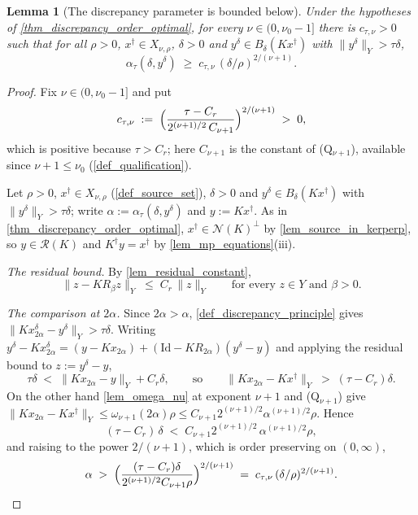 \documentclass[a4paper]{report}
\theoremstyle{plain}
\newtheorem{lemma}[theorem]{Lemma}
\theoremstyle{definition}
\theoremstyle{remark}
\newcommand{\Ran}{\mathcal{R}}
\newcommand{\Ker}{\mathcal{N}}
\newcommand{\Id}{\mathrm{Id}}
\newcommand{\dg}{^{\dagger}}
\begin{document}
\begin{lemma}[The discrepancy parameter is bounded below]
  \label{lem_discrepancy_parameter_bound}
  Under the hypotheses of \cref{thm_discrepancy_order_optimal}, for every
  $\nu \in (0,\nu_0-1]$ there is $c_{\tau,\nu} > 0$ such that for all $\rho > 0$,
  $x\dg \in X_{\nu,\rho}$, $\delta > 0$ and $y^{\delta} \in B_{\delta}(Kx\dg)$
  \emph{with} $\|y^{\delta}\|_Y > \tau\delta$,
  \[
    \alpha_{\tau}(\delta, y^{\delta}) \;\ge\; c_{\tau,\nu}\,(\delta/\rho)^{2/(\nu+1)} .
  \]
\end{lemma}

\begin{proof}
  Fix $\nu \in (0,\nu_0-1]$ and put
  \[
    c_{\tau,\nu} \;:=\; \Bigl(\frac{\tau - C_r}{2^{(\nu+1)/2}\,C_{\nu+1}}
      \Bigr)^{2/(\nu+1)} \;>\; 0 ,
  \]
  which is positive because $\tau > C_r$; here $C_{\nu+1}$ is the constant of
  (Q$_{\nu+1}$), available since $\nu + 1 \le \nu_0$ (\cref{def_qualification}).

  Let $\rho > 0$, $x\dg \in X_{\nu,\rho}$ (\cref{def_source_set}), $\delta > 0$ and
  $y^{\delta} \in B_{\delta}(Kx\dg)$ with $\|y^{\delta}\|_Y > \tau\delta$; write $\alpha :=
  \alpha_{\tau}(\delta,y^{\delta})$ and $y := Kx\dg$.  As in
  \cref{thm_discrepancy_order_optimal}, $x\dg \in \Ker(K)^{\perp}$ by
  \cref{lem_source_in_kerperp}, so $y \in \Ran(K)$ and $K\dg y = x\dg$ by
  \cref{lem_mp_equations}(iii).

  \emph{The residual bound.}  By \cref{lem_residual_constant},
  \[
    \|z - KR_{\beta}z\|_Y \;\le\; C_r\,\|z\|_Y
    \qquad\text{for every } z \in Y \text{ and } \beta > 0 .
  \]

  \emph{The comparison at $2\alpha$.}  Since $2\alpha > \alpha$,
  \cref{def_discrepancy_principle} gives $\|Kx^{\delta}_{2\alpha} - y^{\delta}\|_Y >
  \tau\delta$.  Writing $y^{\delta} - Kx^{\delta}_{2\alpha} = (y - Kx_{2\alpha}) +
  (\Id - KR_{2\alpha})(y^{\delta} - y)$ and applying the residual bound to $z :=
  y^{\delta}-y$,
  \[
    \tau\delta \;<\; \|Kx_{2\alpha} - y\|_Y + C_r\delta ,
    \qquad\text{so}\qquad
    \|Kx_{2\alpha} - Kx\dg\|_Y \;>\; (\tau - C_r)\delta .
  \]
  On the other hand \cref{lem_omega_nu} at exponent $\nu+1$ and (Q$_{\nu+1}$) give
  $\|Kx_{2\alpha} - Kx\dg\|_Y \le \omega_{\nu+1}(2\alpha)\rho \le
  C_{\nu+1}2^{(\nu+1)/2}\alpha^{(\nu+1)/2}\rho$.  Hence
  \[
    (\tau - C_r)\,\delta \;<\; C_{\nu+1}2^{(\nu+1)/2}\,\alpha^{(\nu+1)/2}\rho ,
  \]
  and raising to the power $2/(\nu+1)$, which is order preserving on $(0,\infty)$,
  \[
    \alpha \;>\; \Bigl(\frac{(\tau-C_r)\delta}{2^{(\nu+1)/2}C_{\nu+1}\rho}
      \Bigr)^{2/(\nu+1)} \;=\; c_{\tau,\nu}\,(\delta/\rho)^{2/(\nu+1)} . \qedhere
  \]
\end{proof}
\end{document}
